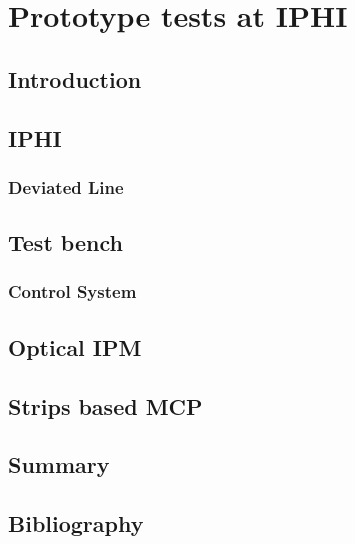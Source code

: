 \chapter{Prototype tests at IPHI}
\cleardoublepage

\minitoc

\section{Introduction}
\begin{refsection}
	\label{ch4:Introduction}

	\section{IPHI}
	\subsection{Deviated Line}
	\section{Test bench}
	\subsection{Control System}
	\section{Optical IPM}
	\section{Strips based MCP}

	\section{Summary}
	\label{ch4:Summary}

	\cleardoublepage
	\section{Bibliography}
	\label{ch4:bib}
	\printbibliography[heading=subbibliography]
\end{refsection}
